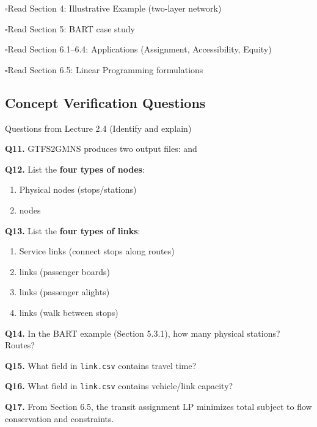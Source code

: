 \documentclass[11pt,letterpaper]{article}
\newcommand{\cmark}{$\square$\hspace{0.3em}}
\newcommand{\fillin}{\underline{\hspace{2cm}}}
\begin{document}
\cmark Read Section 4: Illustrative Example (two-layer network)

\cmark Read Section 5: BART case study

\cmark Read Section 6.1--6.4: Applications (Assignment, Accessibility, Equity)

\cmark Read Section 6.5: Linear Programming formulations

\subsection*{Concept Verification Questions}

\begin{questionbox}{Questions from Lecture 2.4 (Identify and explain)}

\textbf{Q11.} GTFS2GMNS produces two output files: \texttt{\fillin} and \texttt{\fillin}

\vspace{0.2cm}
\textbf{Q12.} List the \textbf{four types of nodes}:
\begin{enumerate}[nosep]
    \item Physical nodes (stops/stations)
    \item \fillin nodes
\end{enumerate}

\vspace{0.2cm}
\textbf{Q13.} List the \textbf{four types of links}:
\begin{enumerate}[nosep]
    \item Service links (connect stops along routes)
    \item \fillin links (passenger boards)
    \item \fillin links (passenger alights)  
    \item \fillin links (walk between stops)
\end{enumerate}

\vspace{0.2cm}
\textbf{Q14.} In the BART example (Section 5.3.1), how many physical stations? \fillin \quad Routes? \fillin

\vspace{0.2cm}
\textbf{Q15.} What field in \texttt{link.csv} contains travel time? \texttt{\fillin}

\vspace{0.2cm}
\textbf{Q16.} What field in \texttt{link.csv} contains vehicle/link capacity? \texttt{\fillin}

\vspace{0.2cm}
\textbf{Q17.} From Section 6.5, the transit assignment LP minimizes total \fillin subject to flow conservation and \fillin constraints.

\end{questionbox}
\end{document}
